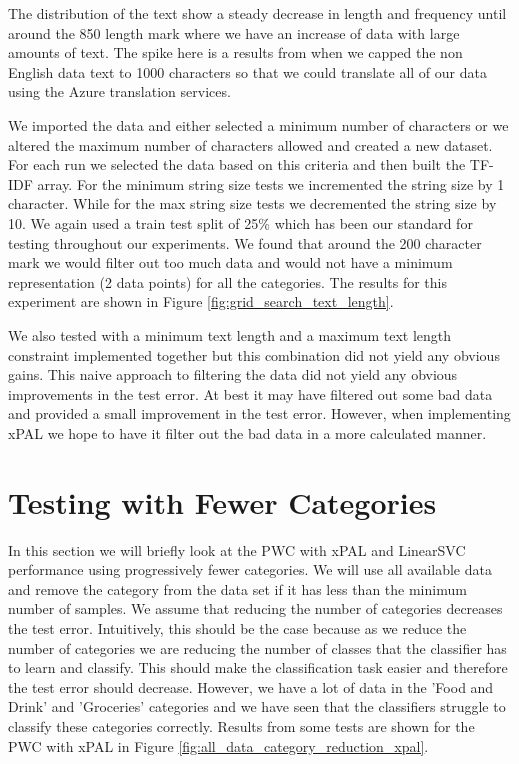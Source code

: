 The distribution of the text show a steady decrease in length and frequency until around the 850 length mark where we have an increase of data with large amounts of text. The spike here is a results from when we capped the non English data text to 1000 characters so that we could translate all of our data using the Azure translation services.

We imported the data and either selected a minimum number of characters or we altered the maximum number of characters allowed and created a new dataset. For each run we selected the data based on this criteria and then built the TF-IDF array. For the minimum string size tests we incremented the string size by 1 character. While for the max string size tests we decremented the string size by 10. We again used a train test split of 25\% which has been our standard for testing throughout our experiments. We found that around the 200 character mark we would filter out too much data and would not have a minimum representation (2 data points) for all the categories. The results for this experiment are shown in Figure \ref{fig:grid_search_text_length}.


We also tested with a minimum text length and a maximum text length constraint implemented together but this combination did not yield any obvious gains. This naive approach to filtering the data did not yield any obvious improvements in the test error. At best it may have filtered out some bad data and provided a small improvement in the test error. However, when implementing xPAL we hope to have it filter out the bad data in a more calculated manner.

\section{Testing with Fewer Categories}

In this section we will briefly look at the PWC with xPAL and LinearSVC performance using progressively fewer categories. We will use all available data and remove the category from the data set if it has less than the minimum number of samples. We assume that reducing the number of categories decreases the test error. Intuitively, this should be the case because as we reduce the number of categories we are reducing the number of classes that the classifier has to learn and classify. This should make the classification task easier and therefore the test error should decrease. However, we have a lot of data in the 'Food and Drink' and 'Groceries' categories and we have seen that the classifiers struggle to classify these categories correctly. Results from some tests are shown for the PWC with xPAL in Figure \ref{fig:all_data_category_reduction_xpal}.

